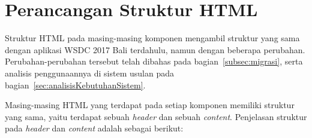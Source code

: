 \section{Perancangan Struktur HTML}
\label{sec:perancanganStrukturHTML}

	Struktur HTML pada masing-masing komponen mengambil struktur yang sama dengan aplikasi WSDC 2017 Bali terdahulu, namun dengan beberapa perubahan. Perubahan-perubahan tersebut telah dibahas pada bagian~\ref{subsec:migrasi}, serta analisis penggunaannya di sistem usulan pada bagian~\ref{sec:analisisKebutuhanSistem}.
	
	Masing-masing HTML yang terdapat pada setiap komponen memiliki struktur yang sama, yaitu terdapat sebuah \textit{header} dan sebuah \textit{content}. Penjelasan struktur pada \textit{header} dan \textit{content} adalah sebagai berikut:
	
